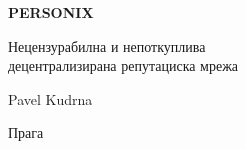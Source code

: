 \thispagestyle{empty}
\begin{center}
  {\sffamily\bfseries\fontsize{34}{40}\selectfont PERSONIX\par}
  \vspace{2.2em}
  {\rmfamily\large Нецензурабилна и непоткуплива\\[0.25em]
   децентрализирана репутациска мрежа\par}
\end{center}
\begin{center}
  {\rmfamily\Large Pavel Kudrna\par}
  \vspace{0.45em}
  {\rmfamily\small Прага\quad\textbullet{}\par}
\end{center}
\clearpage
